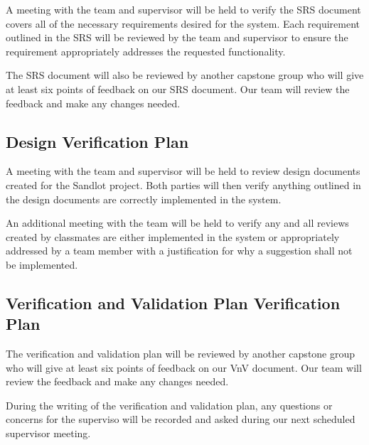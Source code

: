 \documentclass[12pt, titlepage]{article}
\begin{document}

A meeting with the team and supervisor will be held to verify the SRS document covers all of
the necessary requirements desired for the system. Each requirement outlined in the SRS will
be reviewed by the team and supervisor to ensure the requirement appropriately addresses the
requested functionality.

The SRS document will also be reviewed by another capstone group who will give
at least six points of feedback on our SRS document. Our team will review the
feedback and make any changes needed.

\subsection{Design Verification Plan}




A meeting with the team and supervisor will be held to review design documents created
for the Sandlot project. Both parties will then verify anything outlined in the design
documents are correctly implemented in the system.

An additional meeting with the team will be held to verify any and all reviews created by
classmates are either implemented in the system or appropriately addressed by a team member
with a justification for why a suggestion shall not be implemented.

\subsection{Verification and Validation Plan Verification Plan}




The verification and validation plan will be reviewed by another capstone
group who will give at least six points of feedback on our VnV document. Our
team will review the feedback and make any changes needed. 

During the writing of the verification and validation plan, any questions or
concerns for the superviso will be recorded and asked during our next
scheduled supervisor meeting.
\end{document}
